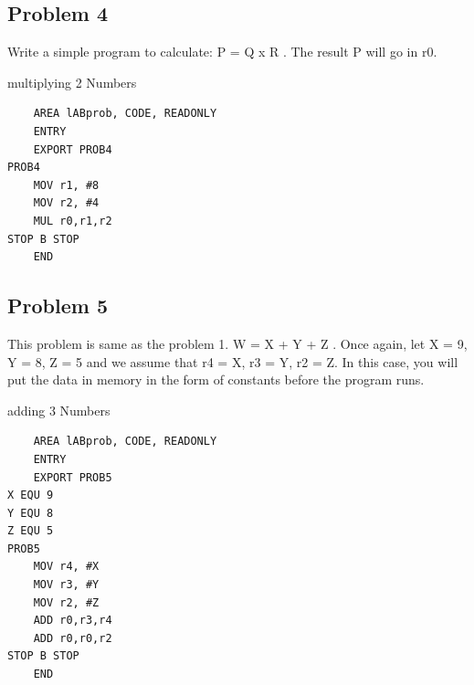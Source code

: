 \documentclass[11pt]{article}
\begin{document}
\subsection{Problem 4}
Write a simple program to calculate: P = Q x R . The result P will go in r0.

\begin{listing}[h]
    \caption{multiplying 2 Numbers}
    \begin{verbatim}
    AREA lABprob, CODE, READONLY
    ENTRY
    EXPORT PROB4
PROB4
	MOV r1, #8
	MOV r2, #4
	MUL r0,r1,r2
STOP B STOP
    END
\end{verbatim}
\end{listing}
\newpage
\subsection{Problem 5}
This problem is same as the problem 1. W = X + Y + Z . Once again, let X = 9, Y = 8, Z = 5
and we assume that r4 = X, r3 = Y, r2 = Z. In this case, you will put the data in memory in the
form of constants before the program runs.

\begin{listing}[h]
    \caption{adding 3 Numbers}
    \begin{verbatim}
    AREA lABprob, CODE, READONLY
    ENTRY
    EXPORT PROB5
X EQU 9
Y EQU 8
Z EQU 5
PROB5
	MOV r4, #X
	MOV r3, #Y
	MOV r2, #Z
	ADD r0,r3,r4
	ADD r0,r0,r2
STOP B STOP
    END
\end{verbatim}
\end{listing}


\nocite{*}
\end{document}
